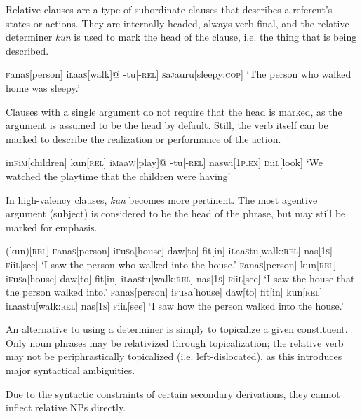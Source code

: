 \documentclass[a4paper,10pt,twoside,openright]{memoir}
\newcommand{\famwordold}[5]{#1\textsc{#2}#3\textsc{#4}#5}
\begin{document}
Relative clauses are a type of subordinate clauses that describes a referent's states or actions. They are internally headed, always verb-final, and the relative determiner \emph{kun} is used to mark the head of the clause, i.e. the thing that is being described.

\ex
\begingl
\famwordold{}{f}{ana}{s}{}[person]
\famwordold{i}{l}{aa}{s}{}[walk]@
-tu[\textsc{-rel}]
\famwordold{}{s}{a}{j}{a}uru[sleepy:\textsc{cop}]
\glft `The person who walked home was sleepy.'
\endgl
\xe

Clauses with a single argument do not require that the head is marked, as the argument is assumed to be the head by default. Still, the verb itself can be marked to describe the realization or performance of the action.

\ex
\begingl
\famwordold{in}{f}{i}{m}{}[children]
kun[\textsc{rel}]
\famwordold{i}{m}{aa}{w}{}[play]@
-tu[\textsc{-rel}]
naswi[\textsc{1p.ex}]
\famwordold{}{d}{ii}{l}{}[look]
\glft `We watched the playtime that the children were having'
\endgl
\xe

In high-valency clauses, \emph{kun} becomes more pertinent. The most agentive argument (subject) is considered to be the head of the phrase, but may still be marked for emphasis.

\pex[interpartskip=3ex]
\a
\begingl
(kun)[\textsc{rel}]
\famwordold{}{f}{ana}{s}{}[person]
\famwordold{i}{f}{u}{s}{a}[house]
daw[to]
fit[in]
\famwordold{i}{l}{aa}{s}{}tu[walk\textsc{:rel}]
nas[\textsc{1s}]
\famwordold{}{f}{ii}{l}{}[see]
\glft `I saw the person who walked into the house.'
\endgl
\a
\begingl
\famwordold{}{f}{ana}{s}{}[person]
kun[\textsc{rel}]
\famwordold{i}{f}{u}{s}{a}[house]
daw[to]
fit[in]
\famwordold{i}{l}{aa}{s}{}tu[walk\textsc{:rel}]
nas[\textsc{1s}]
\famwordold{}{f}{ii}{l}{}[see]
\glft `I saw the house that the person walked into.'
\endgl
\a
\begingl
\famwordold{}{f}{ana}{s}{}[person]
\famwordold{i}{f}{u}{s}{a}[house]
daw[to]
fit[in]
kun[\textsc{rel}]
\famwordold{i}{l}{aa}{s}{}tu[walk\textsc{:rel}]
nas[\textsc{1s}]
\famwordold{}{f}{ii}{l}{}[see]
\glft `I saw how the person walked into the house.'
\endgl
\xe

An alternative to using a determiner is simply to topicalize a given constituent. Only noun phrases may be relativized through topicalization; the relative verb may not be periphrastically topicalized (i.e. left-dislocated), as this introduces major syntactical ambiguities.

Due to the syntactic constraints of certain secondary derivations, they cannot inflect relative NPs directly.
\end{document}
